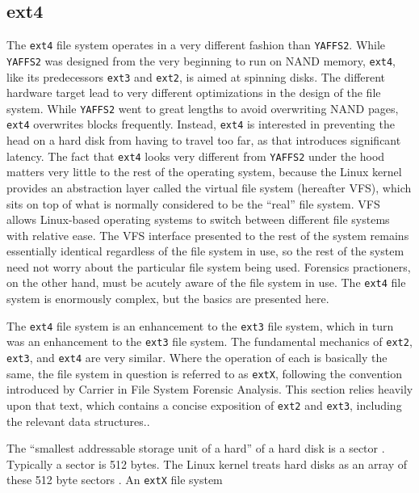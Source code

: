 \subsection{ext4}
The \texttt{ext4} file system operates in a very different fashion than \texttt{YAFFS2}. While \texttt{YAFFS2} was designed from the
very beginning to run on NAND memory, \texttt{ext4}, like its predecessors \texttt{ext3} and \texttt{ext2}, is aimed at spinning
disks. The different hardware target lead to very different optimizations in the design of the file system. While \texttt{YAFFS2}
went to great lengths to avoid overwriting NAND pages, \texttt{ext4} overwrites blocks frequently. Instead, \texttt{ext4} is
interested in preventing the head on a hard disk from having to travel too far, as that introduces significant latency.  The fact
that \texttt{ext4} looks very different from \texttt{YAFFS2} under the hood matters very little to the rest of the operating system,
because the Linux kernel provides an abstraction layer called the virtual file system (hereafter VFS), which sits on top of what is
normally considered to be the ``real'' file system. VFS allows Linux-based operating systems to switch between different file
systems with relative ease. The VFS interface presented to the rest of the system remains essentially identical regardless of the
file system in use, so the rest of the system need not worry about the particular file system being used. Forensics practioners, on
the other hand, must be acutely aware of the file system in use. The \texttt{ext4} file system is enormously complex, but the basics
are presented here.

The \texttt{ext4} file system is an enhancement to the \texttt{ext3} file system, which in turn was an enhancement to the
\texttt{ext3} file system. The fundamental mechanics of \texttt{ext2}, \texttt{ext3}, and \texttt{ext4} are very similar. Where the
operation of each is basically the same, the file system in question is referred to as \texttt{extX}, following the convention
introduced by Carrier \citeyear{carrier} in File System Forensic Analysis. This section relies heavily upon that text, which
contains a concise exposition of \texttt{ext2} and \texttt{ext3}, including the relevant data structures..

The ``smallest addressable storage unit of a hard'' of a hard disk is a sector \cite[p. 30]{carrier}. Typically a sector is 512
bytes. The Linux kernel treats hard disks as an array of these 512 byte sectors \cite{linuxdrivers}.
An \texttt{extX} file system 

